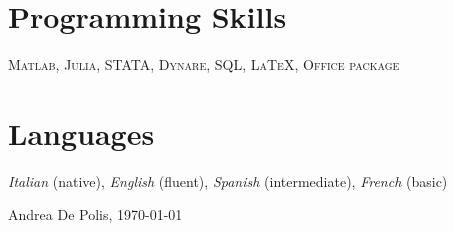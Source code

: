 \documentclass[a4paper,11pt]{article}
\begin{document}
\section{Programming Skills}
\noindent
\textsc{Matlab}, \textsc{Julia}, \textsc{STATA}, \textsc{Dynare}, \textsc{SQL}, \textsc{\LaTeX}, \textsc{Office package}

\section{Languages}
\noindent \textit{Italian} (native), \textit{English} (fluent), \textit{Spanish} (intermediate), \textit{French} (basic)

\vfill
{\begin{center}\color{black!30} Andrea De Polis, \monthyeardate\today \end{center}}
\end{document}
